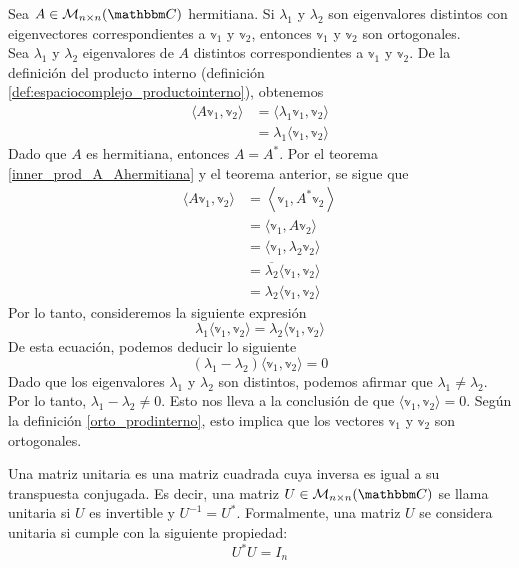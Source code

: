 \begin{theorem}\label{theorem_hermitiana2}
    Sea $A \in \mathcal{M}_{n \times n}(\CC)$ hermitiana. Si $\lambda_1$ y $\lambda_2$ son eigenvalores distintos con eigenvectores correspondientes a $\mathbb{v}_1$ y $\mathbb{v}_2$, entonces $\mathbb{v}_1$ y $\mathbb{v}_2$ son ortogonales. \\
    \demostracion Sea $\lambda_1$ y $\lambda_2$ eigenvalores de $A$ distintos correspondientes a $\mathbb{v}_1$ y $\mathbb{v}_2$. De la definición del producto interno (definición \ref{def:espaciocomplejo_productointerno}), obtenemos
    \begin{align*}
        \langle A\mathbb{v}_1, \mathbb{v}_2 \rangle & = \langle \lambda_1 \mathbb{v}_1, \mathbb{v}_2 \rangle \\
        & = \lambda_1 \langle \mathbb{v}_1, \mathbb{v}_2 \rangle
    \end{align*}
    Dado que $A$ es hermitiana, entonces $A = A^*$. Por el teorema \ref{inner_prod_A_Ahermitiana} y el teorema anterior, se sigue que
    \begin{align*}
        \langle A\mathbb{v}_1, \mathbb{v}_2 \rangle & = \left\langle \mathbb{v}_1, A^* \mathbb{v}_2 \right\rangle \\
        & = \langle \mathbb{v}_1, A\mathbb{v}_2 \rangle \\
        & = \langle \mathbb{v}_1, \lambda_2 \mathbb{v}_2 \rangle \\
        & = \overline{\lambda_2} \langle \mathbb{v}_1, \mathbb{v}_2 \rangle \\
        & = \lambda_2 \langle \mathbb{v}_1, \mathbb{v}_2 \rangle
    \end{align*}
    Por lo tanto, consideremos la siguiente expresión
    $$\lambda_1 \langle \mathbb{v}_1, \mathbb{v}_2 \rangle = \lambda_2 \langle \mathbb{v}_1, \mathbb{v}_2 \rangle$$
    De esta ecuación, podemos deducir lo siguiente
    $$(\lambda_1 - \lambda_2) \langle \mathbb{v}_1, \mathbb{v}_2 \rangle = 0$$
    Dado que los eigenvalores $\lambda_1$ y $\lambda_2$ son distintos, podemos afirmar que $\lambda_1 \neq \lambda_2$. Por lo tanto, $\lambda_1 - \lambda_2 \neq 0$. Esto nos lleva a la conclusión de que $\langle \mathbb{v}_1, \mathbb{v}_2 \rangle = 0$. Según la definición \ref{orto_prodinterno}, esto implica que los vectores $\mathbb{v}_1$ y $\mathbb{v}_2$ son ortogonales.
\end{theorem}

\begin{definition}
    Una matriz unitaria es una matriz cuadrada cuya inversa es igual a su transpuesta conjugada. Es decir, una matriz $U \in \mathcal{M}_{n \times n}(\CC)$ se llama unitaria si $U$ es invertible y $U^{-1} = U^*$. Formalmente, una matriz $U$ se considera unitaria si cumple con la siguiente propiedad:
    \[ U^* U = I_n \]
\end{definition}

